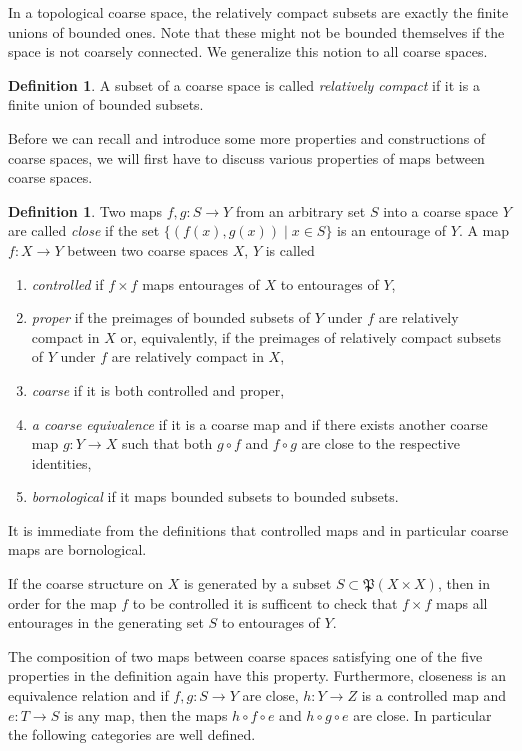 \documentclass[pdftex]{sigma}
\numberwithin{equation}{section}
\theoremstyle{definition}
\newtheorem{defn}[thm]{Definition}
\newcommand{\fP}{\mathfrak{P}}
\begin{document}
In a topological coarse space, the relatively compact subsets are exactly the finite unions of bounded ones.
Note that these might not be bounded themselves if the space is not coarsely connected.
We generalize this notion to all coarse spaces.
\begin{defn}\label{def:relativelycompact}
A subset of a coarse space is called \emph{relatively compact} if it is a finite union of bounded subsets.
\end{defn}


Before we can recall and introduce some more properties and constructions of coarse spaces, we will first have to discuss various properties of maps between coarse spaces.

\begin{defn}\label{def:propertiesmapsbetweencoarsespaces}
Two maps $f,g\colon S\to Y$ from an arbitrary set $S$ into a coarse space $Y$ are called \emph{close} if the set $\{(f(x),g(x))\mid x\in S\}$ is an entourage of $Y$.
A map $f\colon X\to Y$ between two coarse spaces $X$, $Y$ is called
\begin{enumerate}\itemsep=0pt
\item[$1)$] \emph{controlled} if $f\times f$ maps entourages of $X$ to entourages of $Y$,
\item[$2)$] \emph{proper} if the preimages of bounded subsets of $Y$ under $f$ are relatively compact in $X$ or, equivalently, if the preimages of relatively compact subsets of $Y$ under $f$ are relatively compact in $X$,
\item[$3)$] \emph{coarse} if it is both controlled and proper,
\item[$4)$] \emph{a coarse equivalence} if it is a coarse map and if there exists another coarse map $g\colon Y\to X$ such that both $g\circ f$ and $f\circ g$ are close to the respective identities,
\item[$5)$] \emph{bornological} if it maps bounded subsets to bounded subsets.
\end{enumerate}
\end{defn}

It is immediate from the definitions that controlled maps and in particular coarse maps are bornological.

If the coarse structure on $X$ is generated by a subset $S\subset \fP(X\times X)$, then in order for the map $f$ to be controlled it is sufficent to check that $f\times f$ maps all entourages in the generating set $S$ to entourages of $Y$.

The composition of two maps between coarse spaces satisfying one of the five properties in the definition again have this property. Furthermore, closeness is an equivalence relation and if $f,g\colon S\to Y$ are close, $h\colon Y\to Z$ is a controlled map and $e\colon T\to S$ is any map, then the maps $h\circ f\circ e$ and $h\circ g\circ e$ are close.
In particular the following categories are well defined.
\end{document}
